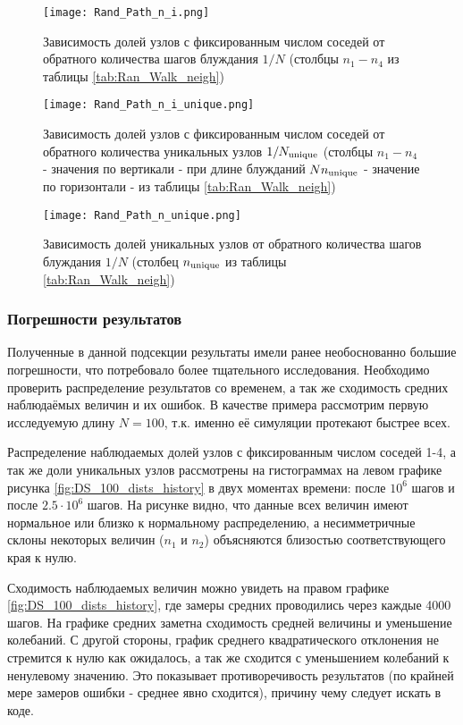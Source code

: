 \begin{figure}
    
\begin{minipage}{0.49\textwidth}
\centering
\texttt{[image: Rand\_Path\_n\_i.png]}
\caption{Зависимость долей узлов с фиксированным числом соседей от обратного количества шагов блуждания $1/N$  (столбцы $n_1-n_4$ из таблицы \ref{tab:Ran_Walk_neigh})}
\label{fig:DS_n_i}
\end{minipage}
\hfill
\begin{minipage}{0.49\textwidth}
\centering
\texttt{[image: Rand\_Path\_n\_i\_unique.png]}
\caption{Зависимость долей узлов с фиксированным числом соседей от обратного количества уникальных узлов $1/N_{\textup{unique}}$  (столбцы $n_1-n_4$ - значения по вертикали - при длине блужданий $N n_{\textup{unique}}$ - значение по горизонтали - из таблицы \ref{tab:Ran_Walk_neigh})}
\label{fig:DS_n_iu}
\end{minipage}
\centering
\texttt{[image: Rand\_Path\_n\_unique.png]}
\caption{Зависимость долей уникальных узлов от обратного количества шагов блуждания $1/N$ (столбец $n_{\textup{unique}}$ из таблицы \ref{tab:Ran_Walk_neigh})}
\label{fig:DS_n_u}
\end{figure} 

\newpage

\subsubsection{Погрешности результатов}

Полученные в данной подсекции результаты имели ранее необоснованно большие погрешности, что потребовало более тщательного исследования. 
Необходимо проверить распределение результатов со временем, а так же сходимость средних наблюдаёмых величин и их ошибок.
 В качестве примера рассмотрим первую исследуемую длину $N=100$, т.к. именно её симуляции протекают быстрее всех.  

Распределение наблюдаемых долей узлов с фиксированным числом соседей 1-4, а так же доли уникальных узлов рассмотрены на гистограммах на левом графике рисунка \ref{fig:DS_100_dists_history}  в двух моментах времени: после $10^6$ шагов и после $2.5 \cdot 10^6$  шагов. 
На рисунке видно, что данные всех величин имеют нормальное или близко к нормальному распределению, а несимметричные склоны  некоторых величин ($n_1$ и $n_2$) объясняются близостью соответствующего края к нулю.

Сходимость наблюдаемых величин можно увидеть на правом графике \ref{fig:DS_100_dists_history}, где замеры средних проводились через каждые 4000 шагов. На графике средних заметна сходимость средней величины и уменьшение колебаний. 
С другой стороны, график среднего квадратического отклонения не стремится к нулю как ожидалось, а так же сходится с уменьшением колебаний к ненулевому значению. 
Это показывает противоречивость результатов (по крайней мере замеров ошибки - среднее явно сходится), причину чему следует искать в коде. 

